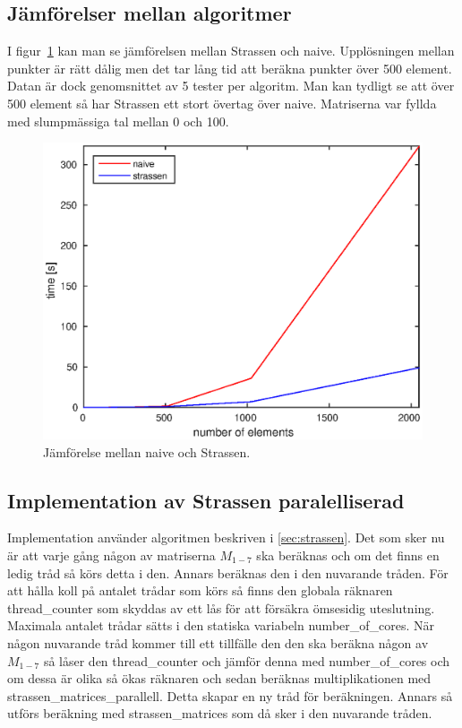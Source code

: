 \subsection{Jämförelser mellan algoritmer}
I figur~\ref{fig:comparison} kan man se jämförelsen mellan Strassen och naive. Upplösningen mellan punkter är rätt dålig men det tar lång tid att beräkna punkter över 500 element. Datan är dock genomsnittet av 5 tester per algoritm. Man kan tydligt se att över 500 element så har Strassen ett stort övertag över naive. Matriserna var fyllda med slumpmässiga tal mellan 0 och 100. 

\begin{figure}[H]
	\begin{center}
		\includegraphics[scale=0.6]{martin-tex/comparison.eps}
	\end{center}
	\caption{Jämförelse mellan naive och Strassen.}
	\label{fig:comparison}
\end{figure}

\subsection{Implementation av Strassen paralelliserad}
Implementation använder algoritmen beskriven i \ref{sec:strassen}. Det som sker nu är att varje gång någon av matriserna $M_{1-7}$ ska beräknas och om det finns en ledig tråd så körs detta i den. Annars beräknas den i den nuvarande tråden. För att hålla koll på antalet trådar som körs så finns den globala räknaren thread\_counter som skyddas av ett lås för att försäkra ömsesidig uteslutning. Maximala antalet trådar sätts i den statiska variabeln number\_of\_cores. När någon nuvarande tråd kommer till ett tillfälle den den ska beräkna någon av 
$M_{1-7}$ så låser den thread\_counter och jämför denna med number\_of\_cores och om dessa är olika så ökas räknaren och sedan beräknas multiplikationen med strassen\_matrices\_parallell. Detta skapar en ny tråd för beräkningen. Annars så utförs beräkning med strassen\_matrices som då sker i den nuvarande tråden.

